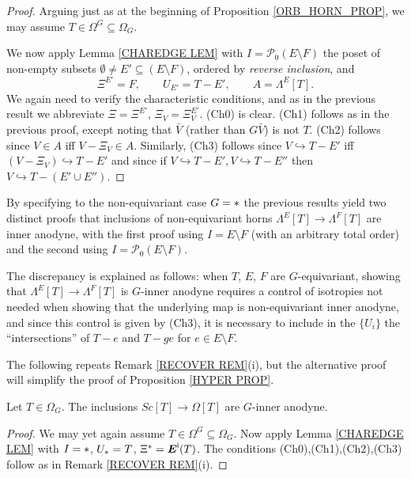 \documentclass[a4paper,10pt
 ,draft
]{article}%
\begin{document}
\begin{proof}
Arguing just as at the beginning of Proposition \ref{ORB_HORN_PROP}, we may assume $T \in \Omega^G \subseteq \Omega_{G}$.

We now apply Lemma \ref{CHAREDGE LEM} with 
$I = \mathcal{P}_0(E\setminus F)$
the poset of non-empty subsets $\emptyset \neq E' \subseteq (E \setminus F)$, ordered by \textit{reverse inclusion}, and
\[
	\Xi^{E'} = F, \qquad
	U_{E'} = T - E', \qquad
	A=\Lambda^{E}[T].
\]
We again need to verify the characteristic conditions,
and as in the previous result we abbreviate
$\Xi = \Xi^{E'}$, $\Xi_V = \Xi^{E'}_V$.
(Ch0) is clear. (Ch1) follows as in the previous proof, except noting that $\bar{V}$ (rather than $G \bar{V}$) is not $T$.
(Ch2) follows since $V \in A$ iff $V-\Xi_V \in A$.
Similarly,
(Ch3) follows since 
$V \hookrightarrow T-E'$ iff $(V-\Xi_V) \hookrightarrow T-E'$
and since if
$V \hookrightarrow T-E',V \hookrightarrow T-E''$
then 
$V \hookrightarrow T-(E' \cup E'')$.
\end{proof}


\begin{remark}\label{TWOPROOF REM}
	By specifying to the non-equivariant case $G = \**$
	the previous results yield two distinct proofs
	that inclusions of non-equivariant horns
	$\Lambda^{E}[T] \to \Lambda^{F}[T]$
	are inner anodyne,
	with the first proof using $I = E \setminus F$ (with an arbitrary total order) and the second using 
	$I = \mathcal{P}_0(E \setminus F)$. 

	The discrepancy is explained as follows: 
	when $T$, $E$, $F$ are $G$-equivariant, showing that
	$\Lambda^{E}[T] \to \Lambda^{F}[T]$ 
	is $G$-inner anodyne requires a control of isotropies 
	not needed when showing that the underlying map is non-equivariant inner anodyne, and since this control is given by (Ch3), it is necessary to include in the $\{U_i\}$ the
	``intersections'' of $T-e$ and $T-ge$ for $e \in E \setminus F$. 
\end{remark}



The following repeats Remark \ref{RECOVER REM}(i),
but the alternative proof will simplify the proof of Proposition \ref{HYPER PROP}. 

\begin{proposition}\label{SCANOD PROP}
Let $T \in \Omega_G$. The inclusions $Sc[T] \to \Omega[T]$ are $G$-inner anodyne.
\end{proposition}

\begin{proof}
We may yet again assume $T \in \Omega^G \subseteq \Omega_G$. 
Now apply Lemma \ref{CHAREDGE LEM} with 
$I=\**$, $U_{\**} = T$, $\Xi^{\**} = \boldsymbol{E}^{\mathsf{i}}(T)$.
The conditions (Ch0),(Ch1),(Ch2),(Ch3) follow as in 
Remark \ref{RECOVER REM}(i).
\end{proof}
\end{document}
